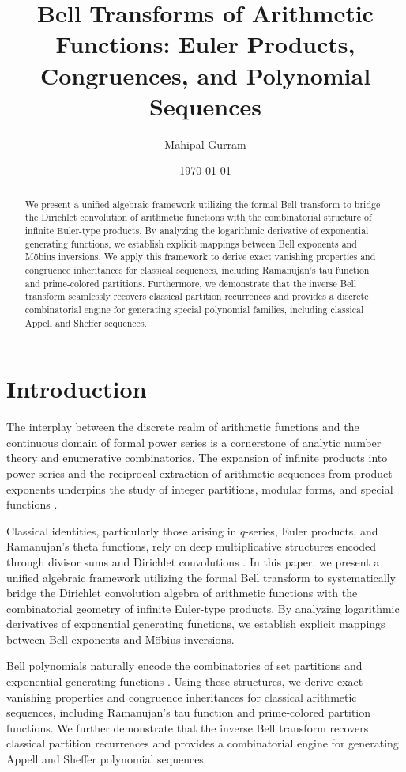 \documentclass[11pt, a4paper]{article}
\title{Bell Transforms of Arithmetic Functions: Euler Products, Congruences, and Polynomial Sequences}
\author{Mahipal Gurram}
\date{\today}
\theoremstyle{remark}
\begin{document}
\maketitle

\begin{abstract}
We present a unified algebraic framework utilizing the formal Bell transform to bridge the Dirichlet convolution of arithmetic functions with the combinatorial structure of infinite Euler-type products. By analyzing the logarithmic derivative of exponential generating functions, we establish explicit mappings between Bell exponents and Möbius inversions. We apply this framework to derive exact vanishing properties and congruence inheritances for classical sequences, including Ramanujan's tau function and prime-colored partitions. Furthermore, we demonstrate that the inverse Bell transform seamlessly recovers classical partition recurrences and provides a discrete combinatorial engine for generating special polynomial families, including classical Appell and Sheffer sequences.
\end{abstract}
\section{Introduction}

The interplay between the discrete realm of arithmetic functions and the continuous domain of formal power series is a cornerstone of analytic number theory and enumerative combinatorics. The expansion of infinite products into power series and the reciprocal extraction of arithmetic sequences from product exponents underpins the study of integer partitions, modular forms, and special functions \cite{Andrews1976}.

Classical identities, particularly those arising in $q$-series, Euler products, and Ramanujan’s theta functions, rely on deep multiplicative structures encoded through divisor sums and Dirichlet convolutions \cite{Andrews1976,HardyWright2008}. In this paper, we present a unified algebraic framework utilizing the formal Bell transform to systematically bridge the Dirichlet convolution algebra of arithmetic functions with the combinatorial geometry of infinite Euler-type products. By analyzing logarithmic derivatives of exponential generating functions, we establish explicit mappings between Bell exponents and Möbius inversions.

Bell polynomials naturally encode the combinatorics of set partitions and exponential generating functions \cite{Comtet1974,Riordan1968}. Using these structures, we derive exact vanishing properties and congruence inheritances for classical arithmetic sequences, including Ramanujan’s tau function and prime-colored partition functions. We further demonstrate that the inverse Bell transform recovers classical partition recurrences and provides a combinatorial engine for generating Appell and Sheffer polynomial sequences 
\end{document}
